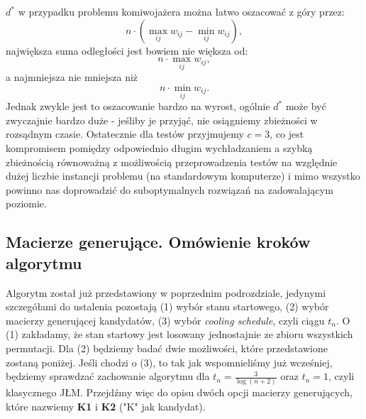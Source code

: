 \documentclass[a4paper]{article}
\theoremstyle{defn}
\theoremstyle{theorem}
\theoremstyle{lemma}
\theoremstyle{cor}
\theoremstyle{fact}
\begin{document}
$d^*$ w przypadku problemu komiwojażera można łatwo oszacować z góry przez: $$n\cdot(\max\limits_{ij} w_{ij} - \min\limits_{ij} w_{ij}),$$
największa suma odległości jest bowiem nie większa od: $$n\cdot\max\limits_{ij} w_{ij},$$
a najmniejsza nie mniejsza niż
$$n\cdot\min\limits_{ij} w_{ij}.$$
Jednak zwykle jest to oszacowanie bardzo na wyrost, ogólnie $d^*$ może być zwyczajnie bardzo duże - jeśliby je przyjąć, nie osiągniemy zbieżności w rozsądnym czasie. Ostatecznie dla testów przyjmujemy $c = 3$, co jest kompromisem pomiędzy odpowiednio długim wychładzaniem a szybką zbieżnością równoważną z możliwością przeprowadzenia testów na względnie dużej liczbie instancji problemu (na standardowym komputerze) i mimo wszystko powinno nas doprowadzić do suboptymalnych rozwiązań na zadowalającym poziomie.
\subsection{Macierze generujące. Omówienie kroków algorytmu}
Algorytm został już przedstawiony w poprzednim podrozdziale, jedynymi szczegółami do ustalenia pozostają (1) wybór stanu startowego, (2) wybór macierzy generującej kandydatów, (3) wybór \textit{cooling schedule}, czyli ciągu $t_n$. O (1) zakładamy, że stan startowy jest losowany jednostajnie ze zbioru wszystkich permutacji. Dla (2) będziemy badać dwie możliwości, które przedstawione zostaną poniżej. Jeśli chodzi o (3), to tak jak wspomnieliśmy już wcześniej, będziemy sprawdzać zachowanie algorytmu dla $t_n = \frac{3}{\log (n+2)}$ oraz $t_n=1$, czyli klasycznego JŁM. Przejdźmy więc do opisu dwóch opcji macierzy generujących, które nazwiemy \textbf{K1} i \textbf{K2} ("K" jak kandydat).
\end{document}
